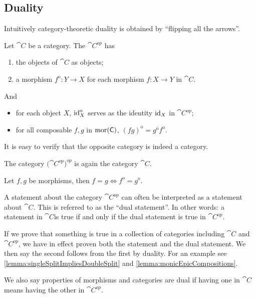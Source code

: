 \subsection{Duality}
Intuitively category-theoretic duality is obtained by ``flipping all the arrows''.
\begin{definition}
Let $\cat{C}$ be a category. The  $\cat{C^{op}}$ has
\begin{enumerate}
\item the objects of $\cat{C}$ as objects;
\item a morphism $f^\text{o}: Y\to X$ for each morphism $f:X\to Y$ in $\cat{C}$.
\end{enumerate}
And
\begin{itemize}
\item for each object $X$, $\operatorname{id}_X^\text{o}$ serves as the identity $\operatorname{id}_X$ in $\cat{C^{op}}$;
\item for all composable $f,g$ in $\operatorname{mor}(\mathsf{C})$, $(fg)^\text{o} = g^\text{o}f^\text{o}$.
\end{itemize}
\end{definition}
It is easy to verify that the opposite category is indeed a category.

\begin{lemma}
The category $(\cat{C^{op})^{op}}$ is again the category $\cat{C}$.
\end{lemma}

\begin{lemma}
Let $f,g$ be morphisms, then $f = g \iff f^o = g^o$.
\end{lemma}

A statement about the category $\cat{C^{op}}$ can often be interpreted as a statement about $\cat{C}$. This is referred to as the ``dual statement''. In other words: a statement in $\cat{C}$is true if and only if the dual statement is true in $\cat{C^{op}}$.

If we prove that something is true in a collection of categories including $\cat{C}$ and $\cat{C^{op}}$, we have in effect proven both the statement and the dual statement. We then say the second follows from the first by duality. For an example see \ref{lemma:singleSplitImpliesDoubleSplit} and \ref{lemma:monicEpicCompositions}.

We also say properties of morphisms and categories are dual if having one in $\cat{C}$ means having the other in $\cat{C^{op}}$.

